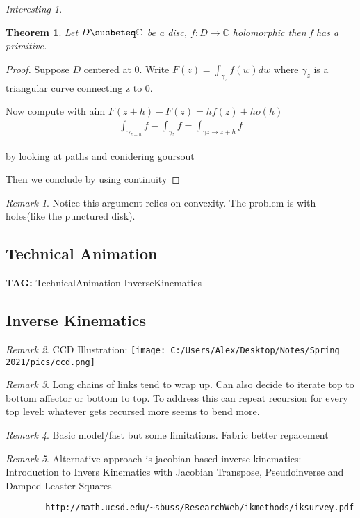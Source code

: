 \documentclass[11pt]{article}
\newcommand{\C}{\mathbb{C}}
\newtheorem{theorem}{Theorem}
\theoremstyle{remark}
\newtheorem{remark}{Remark}
\newtheorem{interest}{Interesting}
\begin{document}
\begin{interest}
\begin{theorem}
	Let $D \susbeteq \C$ be a disc, $f: D \to \C$ holomorphic then f has a primitive. 
\end{theorem}

\begin{proof}
	Suppose $D$ centered at 0. Write $F(z) = \int_{\gamma_z} f(w)dw$ where $\gamma_z$ is a triangular curve connecting z to 0. 

	Now compute with aim $F(z+h) - F(z) = hf(z)+ho(h) $
	\begin{align*}
		\int_{\gamma_{z+h}} f - \int_{\gamma_z}f = \int_{\gamma{z \to z+h}} f 
	\end{align*}

	by looking at paths and conidering goursout

	Then we conclude by using continuity 
\end{proof}

\begin{remark}
	Notice this argument relies on convexity. The problem is with holes(like the punctured disk).
\end{remark}

\subsection{Technical Animation}

\textbf{TAG:} TechnicalAnimation InverseKinematics

\subsection{Inverse Kinematics}

\begin{remark}
	CCD Illustration:
	\texttt{[image: C:/Users/Alex/Desktop/Notes/Spring 2021/pics/ccd.png]}
\end{remark}

\begin{remark}
	Long chains of links tend to wrap up. Can also decide to iterate top to bottom affector or bottom to top. To address this can repeat recursion for every top level: whatever gets recursed more seems to bend more.
\end{remark}

\begin{remark}
	Basic model/fast but some limitations. Fabric better repacement
\end{remark}


\begin{remark}
	Alternative approach is jacobian based inverse kinematics: Introduction to Invers Kinematics with Jacobian Transpose, Pseudoinverse and Damped Leaster Squares
	\begin{verbatim}
		http://math.ucsd.edu/~sbuss/ResearchWeb/ikmethods/iksurvey.pdf
	\end{verbatim}
\end{remark}


\end{interest}
\end{document}
